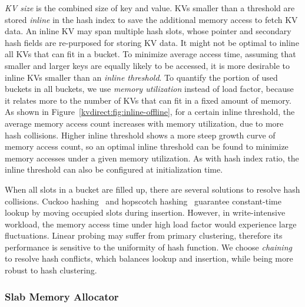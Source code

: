 \textit{KV size} is the combined size of key and value.
KVs smaller than a threshold are stored \textit{inline} in the hash index to save the additional memory access to fetch KV data.
An inline KV may span multiple hash slots, whose pointer and secondary hash fields are re-purposed for storing KV data.
It might not be optimal to inline all KVs that can fit in a bucket.
To minimize average access time, assuming that smaller and larger keys are equally likely to be accessed, it is more desirable to inline KVs smaller than an \textit{inline threshold}.
To quantify the portion of used buckets in all buckets, we use \textit{memory utilization} instead of load factor, because it relates more to the number of KVs that can fit in a fixed amount of memory.
As shown in Figure~\ref{kvdirect:fig:inline-offline}, for a certain inline threshold, the average memory access count increases with memory utilization, due to more hash collisions.
Higher inline threshold shows a more steep growth curve of memory access count, so an optimal inline threshold can be found to minimize memory accesses under a given memory utilization.
As with hash index ratio, the inline threshold can also be configured at initialization time.

When all slots in a bucket are filled up, there are several solutions to resolve hash collisions.
Cuckoo hashing~\cite{pagh2004cuckoo} and hopscotch hashing~\cite{herlihy2008hopscotch} guarantee constant-time lookup by moving occupied slots during insertion.
However, in write-intensive workload, the memory access time under high load factor would experience large fluctuations.
Linear probing may suffer from primary clustering, therefore its performance is sensitive to the uniformity of hash function.
We choose \textit{chaining} to resolve hash conflicts, which balances lookup and insertion, while being more robust to hash clustering.



\subsubsection{Slab Memory Allocator}
\label{kvdirect:sec:slab}

